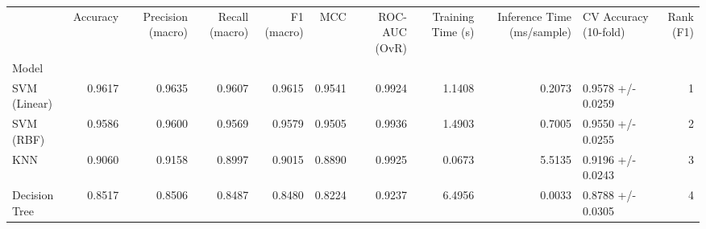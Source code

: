 \begin{tabular}{lrrrrrrrrlr}
\toprule
 & Accuracy & Precision (macro) & Recall (macro) & F1 (macro) & MCC & ROC-AUC (OvR) & Training Time (s) & Inference Time (ms/sample) & CV Accuracy (10-fold) & Rank (F1) \\
Model &  &  &  &  &  &  &  &  &  &  \\
\midrule
SVM (Linear) & 0.9617 & 0.9635 & 0.9607 & 0.9615 & 0.9541 & 0.9924 & 1.1408 & 0.2073 & 0.9578 +/- 0.0259 & 1 \\
SVM (RBF) & 0.9586 & 0.9600 & 0.9569 & 0.9579 & 0.9505 & 0.9936 & 1.4903 & 0.7005 & 0.9550 +/- 0.0255 & 2 \\
KNN & 0.9060 & 0.9158 & 0.8997 & 0.9015 & 0.8890 & 0.9925 & 0.0673 & 5.5135 & 0.9196 +/- 0.0243 & 3 \\
Decision Tree & 0.8517 & 0.8506 & 0.8487 & 0.8480 & 0.8224 & 0.9237 & 6.4956 & 0.0033 & 0.8788 +/- 0.0305 & 4 \\
\bottomrule
\end{tabular}
